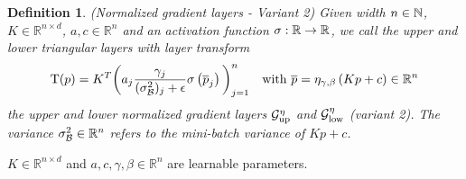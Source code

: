 \documentclass[twoside,a4paper]{article}
\newtheorem{definition}{Definition}
\begin{document}
\begin{definition}
	(Normalized gradient layers - Variant 2)
	Given width $n \in \mathbb{N}$, $K \in \mathbb{R}^{n \times d}$, $a,c \in \mathbb{R}^n$ and
	an activation function $\sigma : \mathbb{R} \to \mathbb{R}$,
	we call the upper and lower triangular layers with layer transform
	\begin{equation*}
		\mathrm{T}(p) = K^T \bigg( a_j \frac{\gamma_j}{(\sigma^2_\mathcal{B})_j + \epsilon}
		\sigma \left( \overline{p}_j \right) \bigg)_{j=1}^n
		\quad \text{with } \overline{p} = \eta_{\gamma, \beta} \left( Kp + c \right) \in \mathbb{R}^n
	\end{equation*}
	the upper and lower normalized gradient layers 
	$\mathcal{G}_{\text{up}}^{\eta}$ and $\mathcal{G}_{\text{low}}^{\eta}$ (variant 2).
	The variance $\sigma^2_\mathcal{B} \in \mathbb{R}^n$ refers to the mini-batch variance of $Kp+c$.
\end{definition}

$K \in \mathbb{R}^{n \times d}$ and $a,c, \gamma, \beta \in \mathbb{R}^n$
are learnable parameters.



\end{document}
